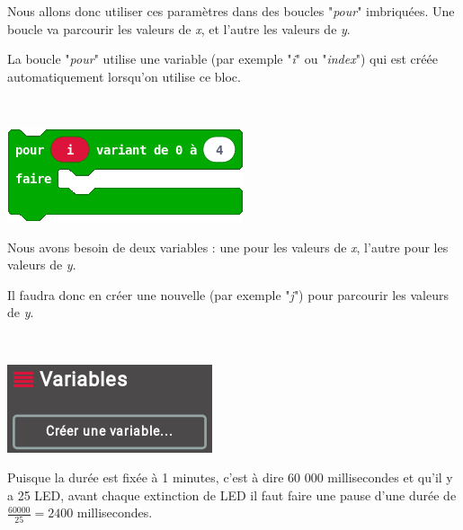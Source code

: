 Nous allons donc utiliser ces paramètres dans des boucles "\emph{pour}" imbriquées. Une boucle va parcourir les valeurs de \textit{x}, et l'autre les valeurs de \textit{y}.


\begin{minipage}[t]{0.75\linewidth}

La boucle "\emph{pour}" utilise une variable (par exemple "\emph{i}" ou "\emph{index}") qui est créée automatiquement lorsqu'on utilise ce bloc.
\end{minipage}
\hfill
\begin{minipage}[t]{0.25\linewidth}~\\
  \vspace{-2mm}
  \begin{center}
    \includegraphics[scale=0.4]{res/blocsMkCd/MB_makecode_boucles-parcourir.png}
  \end{center}
\end{minipage}



\begin{minipage}[t]{0.75\linewidth}
Nous avons besoin de deux variables : une pour les valeurs de \textit{x}, l'autre pour les valeurs de \textit{y}.

Il faudra donc en créer une nouvelle (par exemple "\emph{j}") pour parcourir les valeurs de \textit{y}.
\end{minipage}
\hfill
\begin{minipage}[t]{0.25\linewidth}~\\
  \vspace{-2mm}
  \begin{center}
    \includegraphics[scale=0.5]{res/mb-makecode_creer_variable.png}
  \end{center}
\end{minipage}


Puisque la durée est fixée à 1 minutes, c'est à dire 60 000 millisecondes et qu'il y a 25 LED, avant chaque extinction de LED il faut faire une pause d'une durée de $\frac{60 000}{25} = 2400$ millisecondes.
